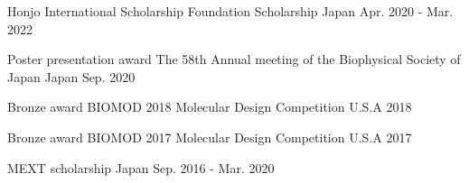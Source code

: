 

\begin{cvhonors}

  \cvhonor
    {Honjo International Scholarship Foundation Scholarship \newline} %
    {} %
    {Japan \newline} %
    {Apr. 2020 - Mar. 2022} %

  \cvhonor
    {Poster presentation award} %
    {The 58th Annual meeting of the Biophysical Society of Japan} %
    {Japan} %
    {Sep. 2020} %

  \cvhonor
    {Bronze award} %
    {BIOMOD 2018 Molecular Design Competition} %
    {U.S.A} %
    {2018} %

  \cvhonor
    {Bronze award} %
    {BIOMOD 2017 Molecular Design Competition} %
    {U.S.A} %
    {2017} %

  \cvhonor
    {MEXT scholarship \newline} %
    {} %
    {Japan \newline} %
    {Sep. 2016 - Mar. 2020} %

\end{cvhonors}


